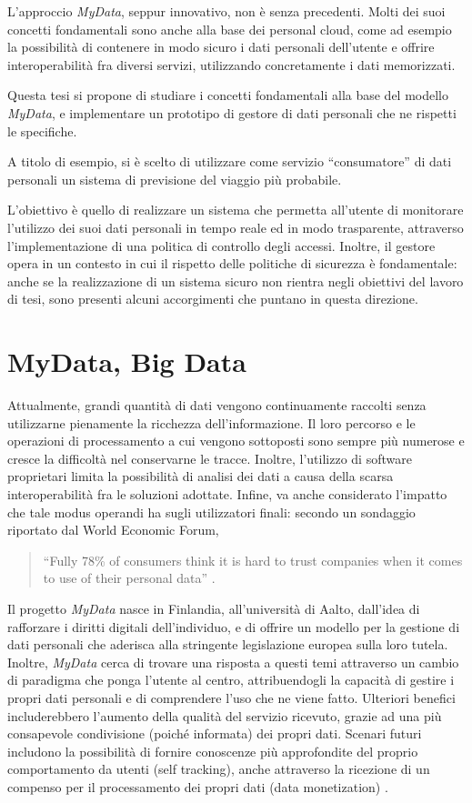 L’approccio \textit{MyData}, seppur innovativo, non \`e senza precedenti. Molti dei suoi concetti fondamentali sono anche alla base dei personal cloud, come ad esempio la possibilit\`a di contenere in modo sicuro i dati personali dell’utente e offrire interoperabilit\`a fra diversi servizi, utilizzando concretamente i dati memorizzati.

Questa tesi si propone di studiare i concetti fondamentali alla base del modello \textit{MyData}, e implementare un prototipo di gestore di dati personali che ne rispetti le specifiche.

A titolo di esempio, si \`e scelto di utilizzare come servizio “consumatore” di dati personali un sistema di previsione del viaggio pi\`u probabile.

L’obiettivo \`e quello di realizzare un sistema che permetta all’utente di monitorare l’utilizzo dei suoi dati personali in tempo reale ed in modo trasparente, attraverso l’implementazione di una politica di controllo degli accessi. Inoltre, il gestore opera in un contesto in cui il rispetto delle politiche di sicurezza \`e fondamentale: anche se la realizzazione di un sistema sicuro non rientra negli obiettivi del lavoro di tesi, sono presenti alcuni accorgimenti che puntano in questa direzione.

\section{MyData, Big Data}
Attualmente, grandi quantit\`a di dati vengono continuamente raccolti senza utilizzarne pienamente la ricchezza dell’informazione. Il loro percorso e le operazioni di processamento a cui vengono sottoposti sono sempre pi\`u numerose e cresce la difficolt\`a nel conservarne le tracce. Inoltre, l’utilizzo di software proprietari limita la possibilit\`a di analisi dei dati a causa della scarsa interoperabilit\`a fra le soluzioni adottate. Infine, va anche considerato l’impatto che tale modus operandi ha sugli utilizzatori finali: secondo un sondaggio riportato dal World Economic Forum, 
\begin{quote}
	“Fully 78\% of consumers think it is hard to trust companies when it comes to use of their personal data” \cite{orangeDigitalTrust}.
\end{quote}

Il progetto \textit{MyData} nasce in Finlandia, all’universit\`a di Aalto, dall’idea di rafforzare i diritti digitali dell’individuo, e di offrire un modello per la gestione di dati personali che aderisca alla stringente legislazione europea sulla loro tutela. Inoltre, \textit{MyData} cerca di trovare una risposta a questi temi attraverso un cambio di paradigma che ponga l’utente al centro, attribuendogli la capacit\`a di gestire i propri dati personali e di comprendere l’uso che ne viene fatto. Ulteriori benefici includerebbero l’aumento della qualit\`a del servizio ricevuto, grazie ad una pi\`u consapevole condivisione (poich\'e informata) dei propri dati. Scenari futuri includono la possibilit\`a di fornire conoscenze pi\`u approfondite del proprio comportamento da utenti (self tracking), anche attraverso la ricezione di un compenso per il processamento dei propri dati (data monetization) \cite{mydatawhitepaper}.

